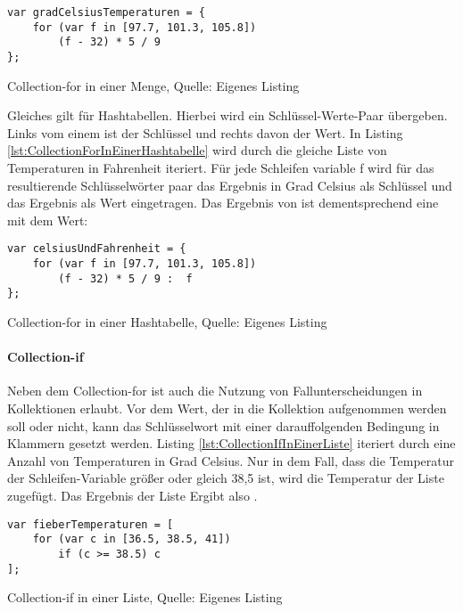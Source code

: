 \ifincludeall
  \begin{listing}[ht]
    \begin{verbatim}
var gradCelsiusTemperaturen = {
    for (var f in [97.7, 101.3, 105.8])
        (f - 32) * 5 / 9
};
\end{verbatim}
    \caption[Collection-for in einer Menge]{Collection-for in einer Menge, Quelle: Eigenes Listing}
    \label{lst:CollectionForInEinerMenge}
  \end{listing}
\fi

Gleiches gilt für Hashtabellen. Hierbei wird ein Schlüssel-Werte-Paar übergeben. Links vom einem \IC{:} ist der Schlüssel und rechts davon der Wert. In Listing \ref{lst:CollectionForInEinerHashtabelle}
wird durch  die gleiche Liste von Temperaturen in Fahrenheit iteriert.  Für jede Schleifen variable f wird für das resultierende Schlüsselwörter paar das Ergebnis in Grad Celsius als Schlüssel und das Ergebnis als Wert eingetragen. Das Ergebnis von  ist dementsprechend eine  mit dem Wert: 

\ifincludeall
  \begin{listing}[ht]
    \begin{verbatim}
var celsiusUndFahrenheit = {
    for (var f in [97.7, 101.3, 105.8])
        (f - 32) * 5 / 9 :  f
};
\end{verbatim}
    \caption[Collection-for in einer Hashtabelle]{Collection-for in einer Hashtabelle, Quelle: Eigenes Listing}
    \label{lst:CollectionForInEinerHashtabelle}
  \end{listing}
\fi

\paragraph{Collection-if}

Neben dem Collection-for ist auch die Nutzung von Fallunterscheidungen in Kollektionen erlaubt. Vor dem Wert, der in die Kollektion aufgenommen werden soll oder nicht,  kann  das Schlüsselwort  mit einer darauffolgenden Bedingung in Klammern gesetzt werden. Listing \ref{lst:CollectionIfInEinerListe} iteriert durch eine Anzahl von Temperaturen in Grad Celsius. Nur in dem Fall, dass die Temperatur der Schleifen-Variable  größer oder gleich 38,5 ist, wird die Temperatur der Liste zugefügt. Das Ergebnis der Liste  Ergibt also \IC{[38.5, 41]}.

\ifincludeall
  \begin{listing}[ht]
    \begin{verbatim}
var fieberTemperaturen = [
    for (var c in [36.5, 38.5, 41])
        if (c >= 38.5) c
];
\end{verbatim}
    \caption[Collection-if in einer Liste]{Collection-if in einer Liste, Quelle: Eigenes Listing}
    \label{lst:CollectionIfInEinerListe}
  \end{listing}
\fi


